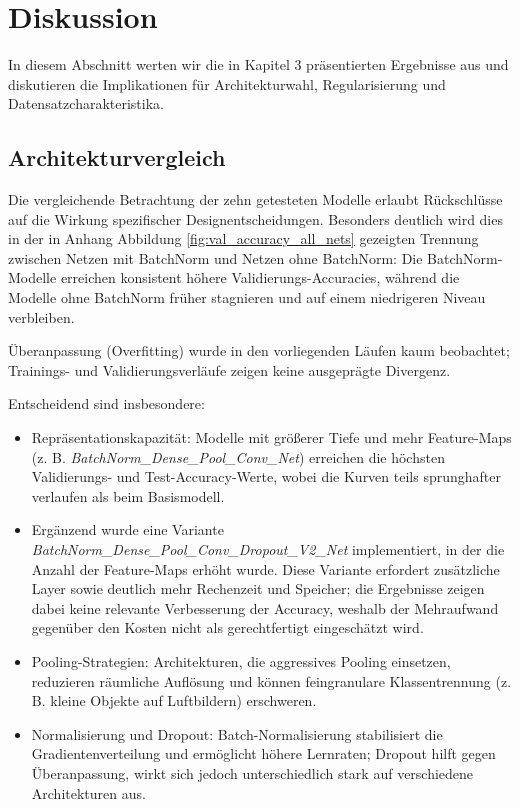 \section{Diskussion}
\label{sec:diskussion}

In diesem Abschnitt werten wir die in Kapitel 3 präsentierten Ergebnisse aus
und diskutieren die Implikationen für Architekturwahl, Regularisierung und
Datensatzcharakteristika.

\subsection{Architekturvergleich}
Die vergleichende Betrachtung der zehn getesteten Modelle erlaubt Rückschlüsse
auf die Wirkung spezifischer Designentscheidungen. Besonders deutlich wird dies
in der in Anhang Abbildung \ref{fig:val_accuracy_all_nets} gezeigten Trennung
zwischen Netzen mit BatchNorm und Netzen ohne BatchNorm: Die BatchNorm-Modelle
erreichen konsistent höhere Validierungs-Accuracies, während die Modelle ohne
BatchNorm früher stagnieren und auf einem niedrigeren Niveau verbleiben.

Überanpassung (Overfitting) wurde in den vorliegenden Läufen kaum beobachtet;
Trainings- und Validierungsverläufe zeigen keine ausgeprägte Divergenz.

Entscheidend sind insbesondere:
\begin{itemize}
    \item Repräsentationskapazität: Modelle mit größerer Tiefe und mehr
          Feature-Maps (z. B. \emph{BatchNorm\_Dense\_Pool\_Conv\_Net}) erreichen die
          höchsten Validierungs- und Test-Accuracy-Werte, wobei die Kurven teils sprunghafter
          verlaufen als beim Basismodell.
    \item Ergänzend wurde eine Variante \emph{BatchNorm\_Dense\_Pool\_Conv\_Dropout\_V2\_Net}
          implementiert, in der die Anzahl der Feature-Maps erhöht wurde. Diese Variante
          erfordert zusätzliche Layer sowie deutlich mehr Rechenzeit und Speicher;
          die Ergebnisse zeigen dabei keine relevante Verbesserung der Accuracy,
          weshalb der Mehraufwand gegenüber den Kosten nicht als gerechtfertigt
          eingeschätzt wird.
    \item Pooling-Strategien: Architekturen, die aggressives Pooling einsetzen,
          reduzieren räumliche Auflösung und können feingranulare Klassentrennung (z. B.
          kleine Objekte auf Luftbildern) erschweren.
    \item Normalisierung und Dropout: Batch-Normalisierung stabilisiert die
          Gradientenverteilung und ermöglicht höhere Lernraten; Dropout hilft gegen
          Überanpassung, wirkt sich jedoch unterschiedlich stark auf verschiedene
          Architekturen aus.
\end{itemize}

